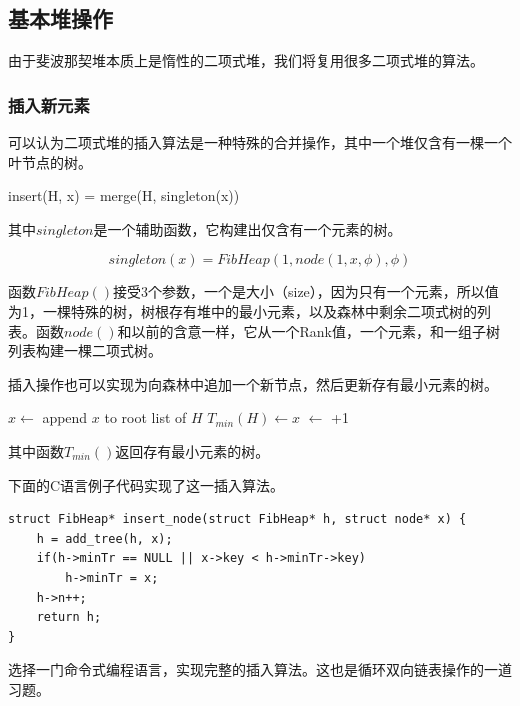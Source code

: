 \documentclass[b5paper]{ctexart}
\begin{document}
\subsection{基本堆操作}

由于斐波那契堆本质上是惰性的二项式堆，我们将复用很多二项式堆的算法。

\subsubsection{插入新元素}

可以认为二项式堆的插入算法是一种特殊的合并操作，其中一个堆仅含有一棵一个叶节点的树。

\be
insert(H, x) = merge(H, singleton(x))
\label{eq:fib-insert}
\ee

其中$singleton$是一个辅助函数，它构建出仅含有一个元素的树。

\[
singleton(x) = FibHeap(1, node(1, x, \phi), \phi)
\]

函数$FibHeap()$接受3个参数，一个是大小（size），因为只有一个元素，所以值为1，一棵特殊的树，树根存有堆中的最小元素，以及森林中剩余二项式树的列表。函数$node()$和以前的含意一样，它从一个Rank值，一个元素，和一组子树列表构建一棵二项式树。

插入操作也可以实现为向森林中追加一个新节点，然后更新存有最小元素的树。

\begin{algorithmic}[1]
  \State $x \gets$  
  \State append $x$ to root list of $H$
    \State $T_{min}(H) \gets x$
  \EndIf
  \State {} $\gets$ +1
\EndFunction
\end{algorithmic}

其中函数$T_{min}()$返回存有最小元素的树。

下面的C语言例子代码实现了这一插入算法。

\lstset{language=C}
\begin{lstlisting}
struct FibHeap* insert_node(struct FibHeap* h, struct node* x) {
    h = add_tree(h, x);
    if(h->minTr == NULL || x->key < h->minTr->key)
        h->minTr = x;
    h->n++;
    return h;
}
\end{lstlisting}

\begin{Exercise}
选择一门命令式编程语言，实现完整的插入算法。这也是循环双向链表操作的一道习题。
\end{Exercise}
\end{document}
